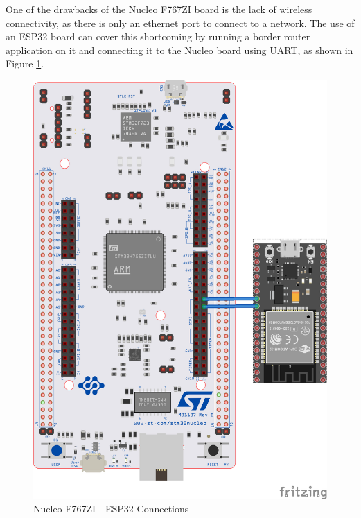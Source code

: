 One of the drawbacks of the Nucleo F767ZI board is the lack of wireless connectivity, as there is only an ethernet port to connect to a network. The use of an ESP32 board can cover this shortcoming by running a border router application on it and connecting it to the Nucleo board using UART, as shown in Figure \ref{fig:esp_con}.
\begin{figure}
    \centering
    \includegraphics{images/ESP_Conn.png}
    \caption{Nucleo-F767ZI - ESP32 Connections}
    \label{fig:esp_con}
\end{figure}


